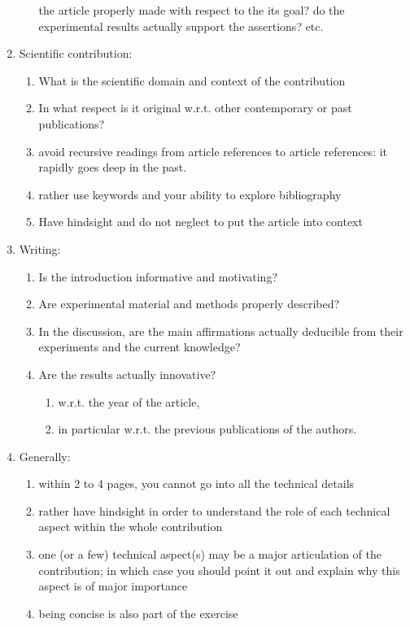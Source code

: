 \documentclass{article}
\begin{document}
\begin{enumerate}
\begin{enumerate}
            the article properly made with respect to the its goal? do the
            experimental results actually support the assertions? etc.
        \end{enumerate}
        \item Scientific contribution:
        \begin{enumerate}
            \item What is the scientific domain and context of the contribution
            \item In what respect is it original w.r.t. other contemporary or past
            publications?
            \item avoid recursive readings from article references to article
            references: it rapidly goes deep in the past.
            \item rather use keywords and your ability to explore bibliography
            \item Have hindsight and do not neglect to put the article into
            context
        \end{enumerate}
        \item Writing:
        \begin{enumerate}
            \item Is the introduction informative and motivating?
            \item Are experimental material and methods properly described?
            \item In the discussion, are the main affirmations actually deducible
            from their experiments and the current knowledge?
            \item Are the results actually innovative?
            \begin{enumerate}
                \item w.r.t. the year of the article,
                \item in particular w.r.t. the previous publications of the authors.
            \end{enumerate}
        \end{enumerate}
        \item Generally:
        \begin{enumerate}
            \item within 2 to 4 pages, you cannot go into all the technical details
            \item rather have hindsight in order to understand the role of each
            technical aspect within the whole contribution
            \item one (or a few) technical aspect(s) may be a major articulation
            of the contribution; in which case you should point it out and explain why this
            aspect is of major importance
            \item being concise is also part of the exercise
        \end{enumerate}
    \end{enumerate}
\end{document}
